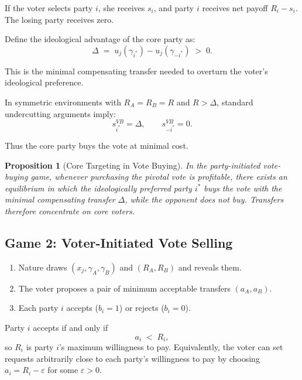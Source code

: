 \documentclass[11pt]{article}
\newtheorem{proposition}{Proposition}
\begin{document}
If the voter selects party $i$, she receives $s_i$, and party $i$ receives net payoff $R_i - s_i$. The losing party receives zero.

Define the ideological advantage of the core party as:
\begin{equation}
\Delta \;=\; u_j(\gamma_{i^\ast}) - u_j(\gamma_{-i^\ast}) \;>\; 0.
\end{equation}

This is the minimal compensating transfer needed to overturn the voter's ideological preference.

In symmetric environments with $R_A = R_B = R$ and $R > \Delta$, standard undercutting arguments imply:
\begin{equation}
s^{VB}_{i^\ast} = \Delta, \qquad s^{VB}_{-i^\ast} = 0.
\end{equation}

Thus the core party buys the vote at minimal cost.

\begin{proposition}[Core Targeting in Vote Buying]\label{prop:core_buying}
In the party-initiated vote-buying game, whenever purchasing the pivotal vote is profitable, there exists an equilibrium in which the ideologically preferred party $i^\ast$ buys the vote with the minimal compensating transfer $\Delta$, while the opponent does not buy. Transfers therefore concentrate on core voters.
\end{proposition}

\subsection*{Game 2: Voter-Initiated Vote Selling}

\begin{enumerate}
\item Nature draws $(x_j,\gamma_A,\gamma_B)$ and $(R_A,R_B)$ and reveals them.
\item The voter proposes a pair of minimum acceptable transfers $(a_A,a_B)$.
\item Each party $i$ accepts ($b_i = 1$) or rejects ($b_i = 0$).
\end{enumerate}

Party $i$ accepts if and only if
\begin{equation}
a_i \;<\; R_i,
\end{equation}
so $R_i$ is party $i$'s maximum willingness to pay. Equivalently, the voter can set requests arbitrarily close to each party's willingness to pay by choosing $a_i = R_i - \varepsilon$ for some $\varepsilon>0$.
\end{document}
